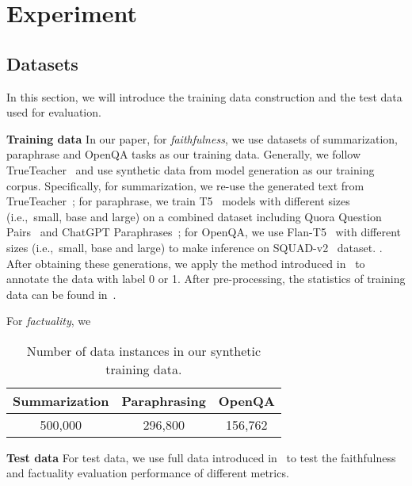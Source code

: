 \section{Experiment}
\subsection{Datasets}
In this section, we will introduce the training data construction and the test data used for evaluation. 

\textbf{Training data}
In our paper, for \emph{faithfulness}, we use datasets of summarization, paraphrase and OpenQA tasks as our training data. Generally, we follow TrueTeacher~\cite{Gekhman2023TrueTeacherLF} and use synthetic data from model generation as our training corpus. Specifically, for summarization, we re-use the generated text from TrueTeacher~\cite{Gekhman2023TrueTeacherLF}; for paraphrase, we train T5~\cite{Raffel2019ExploringTL} models with different sizes (i.e.,~small, base and large) on a combined dataset including Quora Question Pairs~\cite{quora-question-pairs} and ChatGPT Paraphrases~\cite{chatgpt_paraphrases_dataset}; for OpenQA, we use Flan-T5~\cite{Chung2022ScalingIL} with different sizes (i.e.,~small, base and large) to make inference on SQUAD-v2~\cite{squad} dataset. . After obtaining these generations, we apply the method introduced in~ to annotate the data with label 0 or 1. After pre-processing, the statistics of training data can be found in~. 

For \emph{factuality}, we 


\begin{table}[h]
\centering
\small
\begin{tabular}{ccc}
\toprule
\textbf{Summarization} & \textbf{Paraphrasing} & \textbf{OpenQA}  \\ \midrule
500,000       & 296,800      & 156,762 \\ \bottomrule
\end{tabular}
\caption{Number of data instances in our synthetic training data.}
\label{tab:train_data_stat}
\end{table}


\textbf{Test data}
For test data, we use full data introduced in~ to test the faithfulness and factuality evaluation performance of different metrics.

